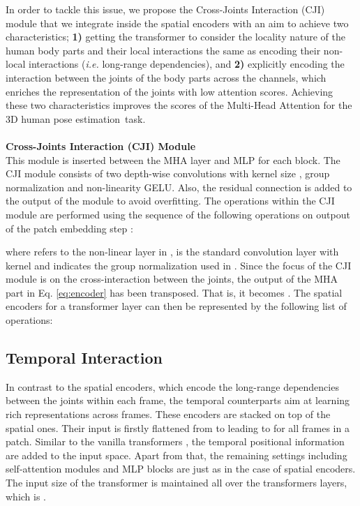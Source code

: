 \documentclass[runningheads]{llncs}
\newcommand{\latinphrase}[1]{\textit{#1}}
\newcommand{\ie}{\latinphrase{i.e.}\xspace}
\begin{document}
In order to tackle this issue, we propose the Cross-Joints Interaction (CJI) module that we integrate inside the spatial encoders with an aim to achieve two characteristics; \textbf{1)} getting the transformer to consider the locality nature of the human body parts and their local interactions the same as encoding their non-local interactions (\ie long-range dependencies), and \textbf{2)} explicitly encoding the interaction between the joints of the body parts across the channels, which enriches the representation of the joints with low attention scores. Achieving these two characteristics improves the scores of the Multi-Head Attention for the 3D human pose estimation~task.\\
\noindent
\\
\textbf{Cross-Joints Interaction (CJI) Module}\\
This module is inserted between the MHA layer and MLP for each block. The CJI module consists of two depth-wise convolutions with kernel size , group normalization and non-linearity GELU. Also, the residual connection is added to the output of the module to avoid overfitting. The operations within the CJI module are performed using the sequence of the following operations on outpout of the patch embedding step :

where  refers to the non-linear layer in \cite{gelu},  is the standard convolution layer with kernel  and  indicates the group normalization used in \cite{wu2018group}. Since the focus of the CJI module is on the cross-interaction between the joints, the output of the MHA part in Eq. \ref{eq:encoder} has been transposed. That is, it becomes . The spatial encoders for a transformer layer  can then be represented by the following list of operations:

\vspace{-1em}
\subsection{Temporal Interaction}
\label{sec:temporal}
In contrast to the spatial encoders, which encode the long-range dependencies between the joints within each frame, the temporal counterparts aim at learning rich representations across frames. These encoders are stacked on top of the spatial ones. Their input is firstly flattened from  to  leading to  for all frames in a patch. Similar to the vanilla transformers \cite{transformers}, the temporal positional information are added to the input space. Apart from that, the remaining settings including self-attention modules and MLP blocks are just as in the case of spatial encoders. The input size of the transformer is maintained all over the transformers layers, which is .\\
\noindent
\\
\end{document}
